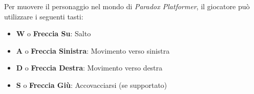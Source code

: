 \documentclass[a4paper,12pt]{report}
\begin{document}
	Per muovere il personaggio nel mondo di \textit{Paradox Platformer}, il giocatore può utilizzare i seguenti tasti:
	
	\begin{itemize}
		\item \textbf{W} o \textbf{Freccia Su}: Salto
		\item \textbf{A} o \textbf{Freccia Sinistra}: Movimento verso sinistra
		\item \textbf{D} o \textbf{Freccia Destra}: Movimento verso destra
		\item \textbf{S} o \textbf{Freccia Giù}: Accovacciarsi (se supportato)
	\end{itemize}
	
	
	
	
\end{document}
